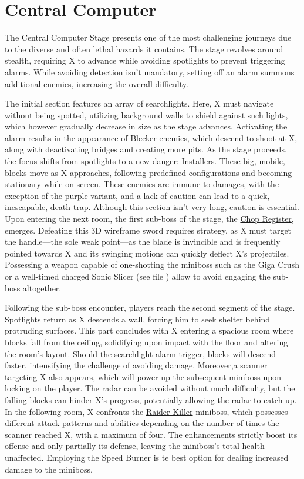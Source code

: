 \section{Central Computer}
The Central Computer Stage presents one of the most challenging journeys due to the diverse and often lethal hazards it contains. The stage revolves around stealth, requiring X to advance while avoiding spotlights to prevent triggering alarms. While avoiding detection isn't mandatory, setting off an alarm summons additional enemies, increasing the overall difficulty.

The initial section features an array of searchlights. Here, X must navigate without being spotted, utilizing background walls to shield against such lights, which however gradually decrease in size as the stage advances. Activating the alarm results in the appearance of \hyperlink{enem:Blecker}{Blecker} enemies, which descend to shoot at X, along with deactivating bridges and creating more pits. As the stage proceeds, the focus shifts from spotlights to a new danger: \hyperlink{enem:Installer}{Installers}. These big, mobile, blocks move as X approaches, following predefined configurations and becoming stationary while on screen. These enemies are immune to damages, with the exception of the purple variant, and a lack of caution can lead to a quick, inescapable, death trap. Although this section isn't very long, caution is essential. Upon entering the next room, the first sub-boss of the stage, the \hyperlink{miniboss:Chop_Register}{Chop Register}, emerges. Defeating this 3D wireframe sword requires strategy, as X must target the handle—the sole weak point—as the blade is invincible and is frequently pointed towards X and its swinging motions can quickly deflect X's projectiles. Possessing a weapon capable of one-shotting the miniboss such as the Giga Crush or a well-timed charged Sonic Slicer (see file  ) allow to avoid engaging the sub-boss altogether.

Following the sub-boss encounter, players reach the second segment of the stage. Spotlights return as X descends a wall, forcing him to seek shelter behind protruding surfaces. This part concludes with X entering a spacious room where blocks fall from the ceiling, solidifying upon impact with the floor and altering the room's layout. Should the searchlight alarm trigger, blocks will descend faster, intensifying the challenge of avoiding damage. Moreover,a scanner targeting X also appears, which will power-up the subsequent miniboss upon locking on the player. The radar can be avoided without much difficulty, but the falling blocks can hinder X's progress, potentially allowing the radar to catch up. In the following room, X confronts the \hyperlink{miniboss:Raider_Killer}{Raider Killer} miniboss, which possesses different attack patterns and abilities depending on the number of times the scanner reached X, with a maximum of four. The enhancements strictly boost its offense and only partially its defense, leaving the miniboss's total health unaffected. Employing the Speed Burner is te best option for dealing increased damage to the miniboss.


